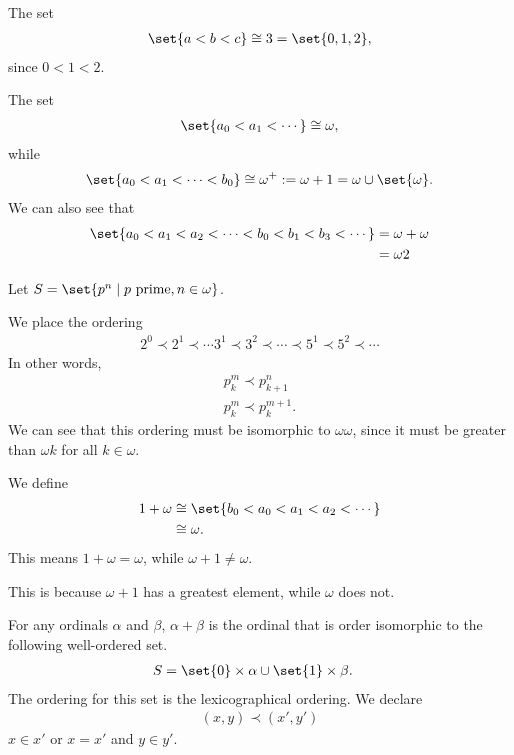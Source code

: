 \documentclass[10pt]{mypackage}
\begin{document}
\begin{example}
  The set
  \begin{align*}
    \set{a < b < c} \cong 3 = \set{0,1,2},
  \end{align*}
  since $0 < 1 < 2$.\newline

  The set
  \begin{align*}
    \set{a_0 < a_1 < \cdots} \cong \omega,
  \end{align*}
  while
  \begin{align*}
    \set{a_0 < a_1 < \cdots < b_0}\cong \omega^{+} := \omega + 1 = \omega \cup \set{\omega}.
  \end{align*}
  We can also see that
  \begin{align*}
    \set{a_0 < a_1 < a_2 < \cdots < b_0 < b_1 < b_3 < \cdots} &= \omega + \omega\\
                                                              &= \omega 2
  \end{align*}
\end{example}
\begin{example}
  Let $S = \set{p^n\mid p\text{ prime}, n\in \omega}$.\newline

  We place the ordering
\begin{align*}
  2^0 \prec 2^1 \prec \cdots 3^1 \prec 3^2 \prec \cdots \prec 5^1 \prec 5^2 \prec \cdots
\end{align*}
In other words,
\begin{align*}
  p_k^{m} \prec p_{k+1}^{n}\\
  p_{k}^{m} \prec p_{k}^{m+1}.
\end{align*}
We can see that this ordering must be isomorphic to $\omega \omega$, since it must be greater than $\omega k$ for all $k \in \omega$.
\end{example}
\begin{example}
  We define
  \begin{align*}
    1 + \omega &\cong \set{b_0 < a_0 < a_1 < a_2 < \cdots}\\
               &\cong \omega.
  \end{align*}
  This means $1 + \omega = \omega$, while $\omega + 1 \neq \omega$.\newline

  This is because $\omega + 1$ has a greatest element, while $\omega$ does not.
\end{example}
\begin{definition}[Addition]
  For any ordinals $\alpha$ and $\beta$, $\alpha + \beta$ is the ordinal that is order isomorphic to the following well-ordered set.
  \begin{align*}
    S &= \set{0}\times \alpha \cup \set{1}\times \beta.
  \end{align*}
  The ordering for this set is the lexicographical ordering. We declare
  \begin{align*}
    (x,y)\prec (x',y')
  \end{align*}
  $x \in x'$ or $x = x'$ and $y\in y'$.
\end{definition}
\end{document}

